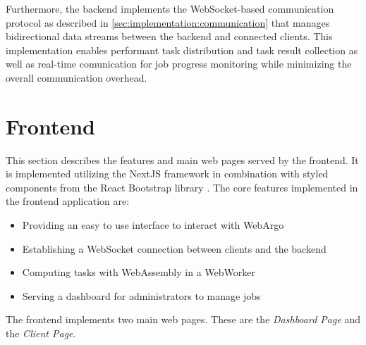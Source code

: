 Furthermore, the backend implements the WebSocket-based communication protocol as described in \autoref{sec:implementation:communication} that manages bidirectional data streams between the backend and connected clients. This implementation enables performant task distribution and task result collection as well as real-time comunication for job progress monitoring while minimizing the overall communication overhead.

\section{Frontend}
\label{sec:implementation:frontend}
This section describes the features and main web pages served by the frontend. It is implemented utilizing the NextJS \cite{methodology:nextjs} framework in combination with styled components from the React Bootstrap library \cite{implementation:bootstrap}. The core features implemented in the frontend application are:
\begin{itemize}
    \item Providing an easy to use interface to interact with WebArgo
    \item Establishing a WebSocket connection between clients and the backend
    \item Computing tasks with WebAssembly in a WebWorker
    \item Serving a dashboard for administrators to manage jobs
\end{itemize}
The frontend implements two main web pages. These are the \emph{Dashboard Page} and the \emph{Client Page}.

